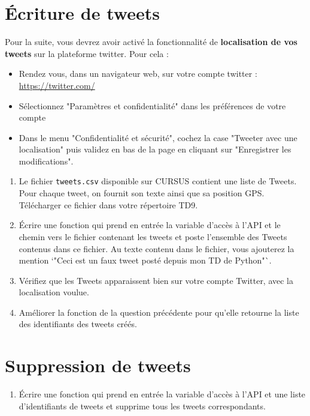 \documentclass[11pt,a4paper]{article}
\begin{document}
\section{Écriture de tweets}

Pour la suite, vous devrez avoir activé la fonctionnalité de \textbf{localisation de vos tweets} sur la plateforme twitter. Pour cela :

\begin{itemize}
\item Rendez vous, dans un navigateur web, sur votre compte twitter : \url{https://twitter.com/}
\item  Sélectionnez "Paramètres et confidentialité" dans les préférences de votre compte
\item  Dans le menu "Confidentialité et sécurité", cochez la case "Tweeter avec une localisation" puis validez en bas de la page en cliquant sur "Enregistrer les modifications".
\end{itemize}

\begin{enumerate}
    \item Le fichier \verb+tweets.csv+ disponible sur CURSUS contient une liste de Tweets. Pour chaque tweet, on fournit son texte ainsi que sa position GPS. Télécharger ce fichier dans votre répertoire TD9.
    \item Écrire une fonction qui prend en entrée la variable d'accès à l'API et le chemin vers le fichier contenant les tweets et poste l'ensemble des Tweets contenus dans ce fichier. Au texte contenu dans le fichier, vous ajouterez la mention `"Ceci est un faux tweet posté depuis mon TD de Python"`. 
    \item Vérifiez que les Tweets apparaissent bien sur votre compte Twitter, avec la localisation voulue.
    \item  Améliorer la fonction de la question précédente pour qu'elle retourne la liste des identifiants des tweets créés.
\end{enumerate}
\section{Suppression de tweets}

\begin{enumerate}
    \item Écrire une fonction qui prend en entrée la variable d'accès à l'API et une liste d'identifiants de tweets et supprime tous les tweets correspondants.
\end{enumerate}
\end{document}
